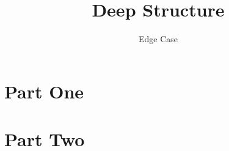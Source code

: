 \documentclass{article}
\title{Deep Structure}
\author{Edge Case}
\begin{document}
\maketitle
\part{Part One}

\part{Part Two}

\end{document}
